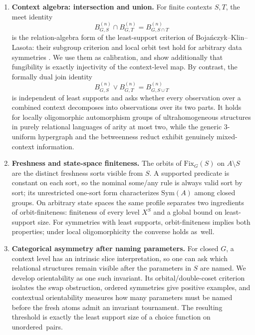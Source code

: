 \documentclass{lmcs}
\newcommand{\Sym}{\mathrm{Sym}}
\newcommand{\Fix}{\mathrm{Fix}}
\begin{document}
\begin{enumerate}[label=\textup{(\arabic*)},leftmargin=2.4em,itemsep=.45em]
\item \textbf{Context algebra: intersection and union.}
For finite contexts $S,T$, the meet identity
\[
 B^{(n)}_{G,S}\cap B^{(n)}_{G,T}=B^{(n)}_{G,S\cap T}
\]
is the relation-algebra form of the least-support criterion of
Boja\'nczyk--Klin--Lasota: their subgroup criterion and local orbit test hold for arbitrary data symmetries \cite[Def.~4.11, Fact~9.2,
Thm.~9.3]{BKL14}. We use them as calibration, and show additionally that
fungibility is exactly injectivity of the context-level map. By contrast,
the formally dual join identity
\[
 B^{(n)}_{G,S}\vee B^{(n)}_{G,T}=B^{(n)}_{G,S\cup T}
\]
is independent of least supports and asks whether every observation over a
combined context decomposes into observations over its two parts. It holds
for locally oligomorphic automorphism groups of ultrahomogeneous
structures in purely relational languages of arity at most two, while the generic $3$-uniform hypergraph and the betweenness
reduct exhibit genuinely mixed-context information.

\item \textbf{Freshness and state-space finiteness.}
The orbits of $\Fix_G(S)$ on $A\setminus S$ are the distinct freshness sorts
visible from $S$. A supported predicate is constant on each sort, so the
nominal \textsf{some/any} rule is always valid sort by sort; its unrestricted
one-sort form characterizes $\Sym(A)$ among closed groups. On arbitrary
state spaces the same profile separates two ingredients of orbit-finiteness:
finiteness of every level $X^S$ and a global bound on least-support size.
For symmetries with least supports, orbit-finiteness implies both
properties; under local oligomorphicity the converse holds as~well.

\item \textbf{Categorical asymmetry after naming parameters.}
For closed $G$, a context level has an intrinsic slice interpretation, so one
can ask which relational structures remain visible after the parameters in
$S$ are named. We develop orientability as one such invariant. Its
orbital/double-coset criterion isolates the swap obstruction, ordered
symmetries give positive examples, and contextual orientability measures how
many parameters must be named before the fresh atoms admit an invariant
tournament. The resulting threshold is exactly the least support size of a
choice function on unordered~pairs.


\end{enumerate}
\end{document}
